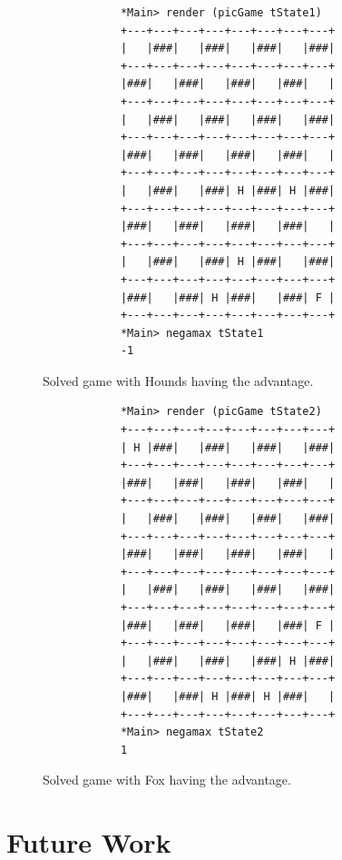 \documentclass[10pt]{article}
\begin{document}
    \begin{figure}[ht]
        \centering
        \begin{verbatim}
            *Main> render (picGame tState1)
            +---+---+---+---+---+---+---+---+
            |   |###|   |###|   |###|   |###|
            +---+---+---+---+---+---+---+---+
            |###|   |###|   |###|   |###|   |
            +---+---+---+---+---+---+---+---+
            |   |###|   |###|   |###|   |###|
            +---+---+---+---+---+---+---+---+
            |###|   |###|   |###|   |###|   |
            +---+---+---+---+---+---+---+---+
            |   |###|   |###| H |###| H |###|
            +---+---+---+---+---+---+---+---+
            |###|   |###|   |###|   |###|   |
            +---+---+---+---+---+---+---+---+
            |   |###|   |###| H |###|   |###|
            +---+---+---+---+---+---+---+---+
            |###|   |###| H |###|   |###| F |
            +---+---+---+---+---+---+---+---+
            *Main> negamax tState1 
            -1    \end{verbatim}
        \caption{Solved game with Hounds having the advantage.} \label{hwin}
    \end{figure}

    \begin{figure}[ht]
     \centering
        \begin{verbatim}
            *Main> render (picGame tState2)
            +---+---+---+---+---+---+---+---+
            | H |###|   |###|   |###|   |###|
            +---+---+---+---+---+---+---+---+
            |###|   |###|   |###|   |###|   |
            +---+---+---+---+---+---+---+---+
            |   |###|   |###|   |###|   |###|
            +---+---+---+---+---+---+---+---+
            |###|   |###|   |###|   |###|   |
            +---+---+---+---+---+---+---+---+
            |   |###|   |###|   |###|   |###|
            +---+---+---+---+---+---+---+---+
            |###|   |###|   |###|   |###| F |
            +---+---+---+---+---+---+---+---+
            |   |###|   |###|   |###| H |###|
            +---+---+---+---+---+---+---+---+
            |###|   |###| H |###| H |###|   |
            +---+---+---+---+---+---+---+---+
            *Main> negamax tState2
            1    \end{verbatim}
        \caption{Solved game with Fox having the advantage.} \label{fwin}
    \end{figure}

\section{Future Work}
\end{document}
